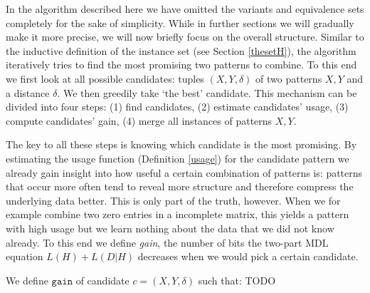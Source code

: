 \documentclass{llncs}
\begin{document}
In the algorithm described here we have omitted the variants and equivalence sets completely for the sake of simplicity. While in further sections we will gradually make it more precise, we will now briefly focus on the overall structure. Similar to the inductive definition of the instance set (see Section \ref{thesetH}), the algorithm iteratively tries to find the most promising two patterns to combine. To this end we first look at all possible candidates: tuples $(X,Y,\delta)$ of two patterns $X,Y$ and a distance $\delta$. We then greedily take `the best' candidate. This mechanism can be divided into four steps: (1) find candidates, (2) estimate candidates' usage, (3) compute candidates' gain, (4) merge all instances of patterns $X, Y$.

The key to all these steps is knowing which candidate is the most promising. By estimating the usage function (Definition \ref{usage}) for the candidate pattern we already gain insight into how useful a certain combination of patterns is: patterns that occur more often tend to reveal more structure and therefore compress the underlying data better. This is only part of the truth, however. When we for example combine two zero entries in a incomplete matrix, this yields a pattern with high usage but we learn nothing about the data that we did not know already. To this end we define \emph{gain}, the number of bits the two-part MDL equation $L(H)+L(D|H)$ decreases when we would pick a certain candidate.
\begin{definition} We define $\mathtt{gain}$ of candidate $c=(X,Y,\delta)$ such that:
TODO
\end{definition}



\end{document}

